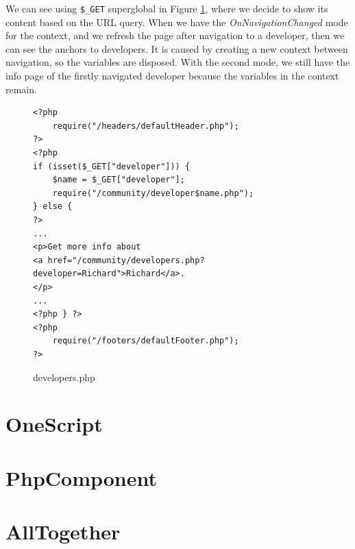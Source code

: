 \par
We can see using \texttt{\$\_GET} superglobal in Figure \ref{img25:developer}, where we decide to show its content based on the URL query.
When we have the \textit{OnNavigationChanged} mode for the context, and we refresh the page after navigation to a developer, then we can see the anchors to developers.
It is caused by creating a new context between navigation, so the variables are disposed.
With the second mode, we still have the info page of the firstly navigated developer because the variables in the context remain.
\par
\begin{figure}[H]
\begin{lstlisting}
<?php
    require("/headers/defaultHeader.php");
?>
<?php
if (isset($_GET["developer"])) { 
    $name = $_GET["developer"];
    require("/community/developer$name.php");
} else {
?>
...
<p>Get more info about 
<a href="/community/developers.php?developer=Richard">Richard</a>.
</p>
...
<?php } ?>
<?php
    require("/footers/defaultFooter.php");
?>
\end{lstlisting}
\caption{developers.php}
\label{img25:developer}
\end{figure}

\section{OneScript}
\section{PhpComponent}
\section{AllTogether}